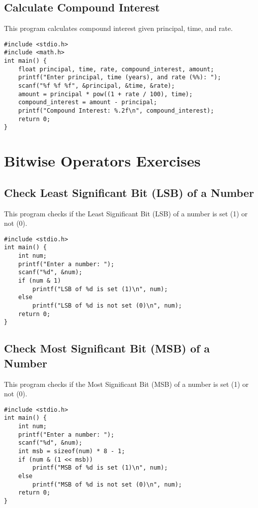 \documentclass[a4paper,12pt]{article}
\begin{document}
\newpage

\subsection{Calculate Compound Interest}
This program calculates compound interest given principal, time, and rate.

\begin{lstlisting}[caption={Calculate Compound Interest}]
#include <stdio.h>
#include <math.h>
int main() {
    float principal, time, rate, compound_interest, amount;
    printf("Enter principal, time (years), and rate (%%): ");
    scanf("%f %f %f", &principal, &time, &rate);
    amount = principal * pow((1 + rate / 100), time);
    compound_interest = amount - principal;
    printf("Compound Interest: %.2f\n", compound_interest);
    return 0;
}
\end{lstlisting}

\newpage

\section{Bitwise Operators Exercises}

\subsection{Check Least Significant Bit (LSB) of a Number}
This program checks if the Least Significant Bit (LSB) of a number is set (1) or not (0).

\begin{lstlisting}[caption={Check Least Significant Bit (LSB) of a Number}]
#include <stdio.h>
int main() {
    int num;
    printf("Enter a number: ");
    scanf("%d", &num);
    if (num & 1)
        printf("LSB of %d is set (1)\n", num);
    else
        printf("LSB of %d is not set (0)\n", num);
    return 0;
}
\end{lstlisting}

\newpage

\subsection{Check Most Significant Bit (MSB) of a Number}
This program checks if the Most Significant Bit (MSB) of a number is set (1) or not (0).

\begin{lstlisting}[caption={Check Most Significant Bit (MSB) of a Number}]
#include <stdio.h>
int main() {
    int num;
    printf("Enter a number: ");
    scanf("%d", &num);
    int msb = sizeof(num) * 8 - 1;
    if (num & (1 << msb))
        printf("MSB of %d is set (1)\n", num);
    else
        printf("MSB of %d is not set (0)\n", num);
    return 0;
}
\end{lstlisting}
\end{document}
